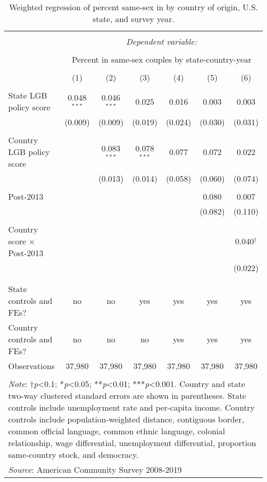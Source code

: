 \documentclass[
  11pt,
]{article}
\begin{document}
\begin{table}[H] \centering 
  \caption{Weighted regression of percent same-sex in by country of origin, U.S. state, and survey year. } 
  \label{tab:state-props} 
\begin{tabular}{@{\extracolsep{5pt}}lcccccc} 
\\[-1.8ex]\hline 
\hline \\[-1.8ex] 
 & \multicolumn{6}{c}{\textit{Dependent variable:}} \\ 
\cline{2-7} 
\\[-1.8ex] & \multicolumn{6}{c}{Percent in same-sex couples by state-country-year} \\ 
\\[-1.8ex] & (1) & (2) & (3) & (4) & (5) & (6)\\ 
\hline \\[-1.8ex] 
 State LGB policy score & 0.048$^{***}$ & 0.046$^{***}$ & 0.025 & 0.016 & 0.003 & 0.003 \\ 
  & (0.009) & (0.009) & (0.019) & (0.024) & (0.030) & (0.031) \\ 
  & & & & & & \\ 
 Country LGB policy score &  & 0.083$^{***}$ & 0.078$^{***}$ & 0.077 & 0.072 & 0.022 \\ 
  &  & (0.013) & (0.014) & (0.058) & (0.060) & (0.074) \\ 
  & & & & & & \\ 
 Post-2013 &  &  &  &  & 0.080 & 0.007 \\ 
  &  &  &  &  & (0.082) & (0.110) \\ 
  & & & & & & \\ 
 Country score × Post-2013 &  &  &  &  &  & 0.040$^{†}$ \\ 
  &  &  &  &  &  & (0.022) \\ 
  & & & & & & \\ 
\hline \\[-1.8ex] 
State controls and FEs? & no & no & yes & yes & yes & yes \\ 
Country controls and FEs? & no & no & no & yes & yes & yes \\ 
Observations & 37,980 & 37,980 & 37,980 & 37,980 & 37,980 & 37,980 \\ 
\hline 
\hline \\[-1.8ex] 
\multicolumn{7}{l}{\parbox[t]{.8\textwidth}{\textit{Note}: †\textit{p}<0.1; *\textit{p}<0.05; **\textit{p}<0.01; ***\textit{p}<0.001. Country and state two-way clustered standard errors are shown in parentheses. State controls include unemployment rate and per-capita income. Country controls include population-weighted distance, contiguous border, common official language, common ethnic language, colonial relationship, wage differential, unemployment differential, proportion same-country stock, and democracy.}} \\ 
\multicolumn{7}{l}{\textit{Source}: American Community Survey 2008-2019} \\ 
\end{tabular} 
\end{table}
\end{document}
